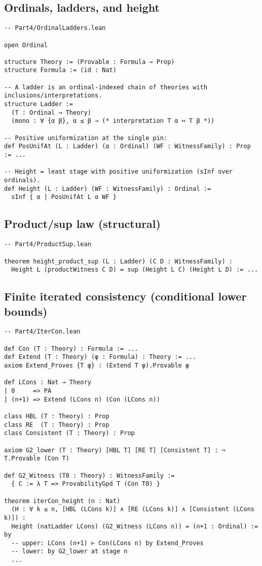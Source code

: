\documentclass[11pt]{article}
\theoremstyle{definition}
\theoremstyle{remark}
\begin{document}
\subsection*{Ordinals, ladders, and height}
\begin{verbatim}
-- Part4/OrdinalLadders.lean

open Ordinal

structure Theory := (Provable : Formula → Prop)
structure Formula := (id : Nat)

-- A ladder is an ordinal-indexed chain of theories with inclusions/interpretations.
structure Ladder :=
  (T : Ordinal → Theory)
  (mono : ∀ {α β}, α ≤ β → (* interpretation T α ↪ T β *))

-- Positive uniformization at the single pin:
def PosUnifAt (L : Ladder) (α : Ordinal) (WF : WitnessFamily) : Prop := ...

-- Height = least stage with positive uniformization (sInf over ordinals).
def Height (L : Ladder) (WF : WitnessFamily) : Ordinal :=
  sInf { α | PosUnifAt L α WF }
\end{verbatim}

\subsection*{Product/sup law (structural)}
\begin{verbatim}
-- Part4/ProductSup.lean

theorem height_product_sup (L : Ladder) (C D : WitnessFamily) :
  Height L (productWitness C D) = sup (Height L C) (Height L D) := ...
\end{verbatim}

\subsection*{Finite iterated consistency (conditional lower bounds)}
\begin{verbatim}
-- Part4/IterCon.lean

def Con (T : Theory) : Formula := ...
def Extend (T : Theory) (φ : Formula) : Theory := ...
axiom Extend_Proves {T φ} : (Extend T φ).Provable φ

def LCons : Nat → Theory
| 0     => PA
| (n+1) => Extend (LCons n) (Con (LCons n))

class HBL (T : Theory) : Prop
class RE  (T : Theory) : Prop
class Consistent (T : Theory) : Prop

axiom G2_lower (T : Theory) [HBL T] [RE T] [Consistent T] : ¬ T.Provable (Con T)

def G2_Witness (T0 : Theory) : WitnessFamily :=
  { C := λ T => ProvabilityGpd T (Con T0) }

theorem iterCon_height (n : Nat)
  (H : ∀ k ≤ n, [HBL (LCons k)] ∧ [RE (LCons k)] ∧ [Consistent (LCons k)]) :
  Height (natLadder LCons) (G2_Witness (LCons n)) = (n+1 : Ordinal) := by
  -- upper: LCons (n+1) ⊢ Con(LCons n) by Extend_Proves
  -- lower: by G2_lower at stage n
  ...
\end{verbatim}
\end{document}
